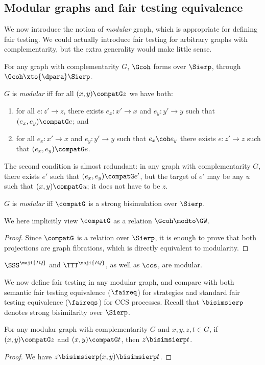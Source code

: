 \documentclass{LMCS}
\renewcommand{\QFI}{\maji{IQ}}
\renewcommand{\LLL}{\QFI}
\renewcommand{\SSSL}{\SSS^{\LLL}}
\renewcommand{\TTTL}{\TTT^{\LLL}}
\theoremstyle{plain}\newtheorem{satz}[thm]{Satz}
\begin{document}
\subsection{Modular graphs and fair testing equivalence}
We now introduce the notion of \emph{modular} graph, which is
appropriate for defining fair testing. We could actually introduce
fair testing for arbitrary graphs with complementarity, but the extra
generality would make little sense.

For any graph with complementarity $G$, $\Gcoh$ forms \anlts{} over
$\Sierp$, through $\Gcoh \xto{\dpara} \Sierp$.
\begin{defi}
  $G$ is \emph{modular} iff for all $(x,y) \compatG z$ we have both:
  \begin{enumerate}
  \item for all $e \colon z' \to z$, there exists $e_x \colon x' \to x$ and
    $e_y \colon y' \to y$ such that $(e_x,e_y) \compatG e$; and\label{modularity:i}
  \item for all $e_x \colon x' \to x$ and $e_y \colon y' \to y$ such that $e_x \coh e_y$
    there exists $e \colon z' \to z$ such that $(e_x,e_y) \compatG e$. \label{modularity:ii}
  \end{enumerate}
\end{defi}
\begin{rem}
  The second condition is almost redundant: in any graph with
  complementarity $G$, there exists $e'$ such that $(e_x,e_y) \compatG
  e'$, but the target of $e'$ may be any $u$ such that $(x,y) \compatG
  u$; it does not have to be $z$.
\end{rem}

\begin{prop}\label{prop:modbis}
   $G$ is \emph{modular} iff ${\compatG}$ is a strong bisimulation
  over $\Sierp$.
\end{prop}
We here implicitly view $\compatG$ as a relation $\Gcoh \modto \GW$.
\begin{proof} 
Since $\compatG$ is a relation over $\Sierp$, it is enough to prove that both 
projections are graph fibrations, which is directly equivalent to modularity.
\end{proof}

\begin{exa}
  $\SSSL$ and $\TTTL$, as well as $\ccs$, are modular.
\end{exa}

We now define fair testing in any modular graph, and compare with both
semantic fair testing equivalence ($\faireq$) for strategies and
standard fair testing equivalence ($\faireqs$) for CCS processes.
Recall that $\bisimsierp$ denotes strong bisimilarity over $\Sierp$.
\begin{lem}
  For any modular graph with complementarity $G$ and $x,y,z,t \in
  G$, if $(x,y) \compatG z$ and $(x,y) \compatG t$, then $z
  \bisimsierp t$.
\end{lem}
\begin{proof}
  We have $z \bisimsierp (x,y) \bisimsierp t$.
\end{proof}
\end{document}
